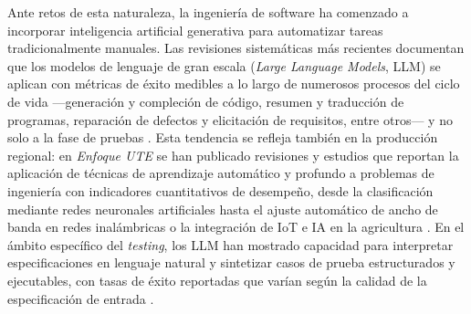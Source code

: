 \documentclass[10pt,journal,twoside,letterpaper]{IEEEtran}
\begin{document}
	Ante retos de esta naturaleza, la ingeniería de software ha comenzado a incorporar inteligencia artificial generativa para automatizar tareas tradicionalmente manuales. Las revisiones sistemáticas más recientes documentan que los modelos de lenguaje de gran escala (\emph{Large Language Models}, LLM) se aplican con métricas de éxito medibles a lo largo de numerosos procesos del ciclo de vida ---generación y compleción de código, resumen y traducción de programas, reparación de defectos y elicitación de requisitos, entre otros--- y no solo a la fase de pruebas \cite{hou2024llm4se,carleton2024genai}. Esta tendencia se refleja también en la producción regional: en \emph{Enfoque UTE} se han publicado revisiones y estudios que reportan la aplicación de técnicas de aprendizaje automático y profundo a problemas de ingeniería con indicadores cuantitativos de desempeño, desde la clasificación mediante redes neuronales artificiales \cite{molina2024ann} hasta el ajuste automático de ancho de banda en redes inalámbricas \cite{carrillo2025ai} o la integración de IoT e IA en la agricultura \cite{basurto2026iotai}. En el ámbito específico del \emph{testing}, los LLM han mostrado capacidad para interpretar especificaciones en lenguaje natural y sintetizar casos de prueba estructurados y ejecutables, con tasas de éxito reportadas que varían según la calidad de la especificación de entrada \cite{wang2024survey,yang2024evaluation,rehan2025harnessing,bhatia2024unit,korraprolu2025testcase,takerngsaksiri2025pytester}.
	
\end{document}
